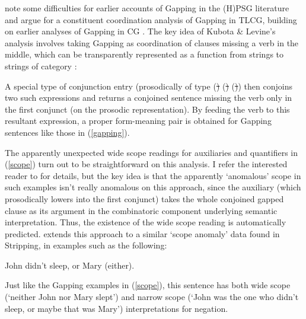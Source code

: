 \documentclass[output=paper]{langsci/langscibook}
\begin{document}
\citet{kubota-levine-nels,kubota-levine-gapping} note some
difficulties for earlier accounts of Gapping in the (H)PSG literature
\citep{sgww,abeille-ea} and argue for a constituent coordination
analysis of Gapping in TLCG, building on earlier analyses of Gapping
in CG \citep{Steedman90a-u,hendriks95,morrillsolias93}. The key idea
of Kubota \& Levine's analysis involves taking Gapping as coordination of clauses
missing a verb in the middle, which can be transparently represented
as a function from strings to strings of category {}:

\begin{exe}
 \ex
  \LexEnt{\pt{\ensuremath{\lambda} \ensuremath{\greekp}. leslie \ensuremath{\circ}\xspace \ensuremath{\greekp} \ensuremath{\circ}\xspace a \ensuremath{\circ}\xspace cd }}{\sem{ \lambda R. \exists x. \trns{cd}(x) \ensuremath{ \wedge\xspace } R(x)(\trns{l}) }}{\syncat{S\vs ((NP\ensuremath{\backslash}{}S)/NP)}}
\end{exe}
A special type of conjunction entry (prosodically of type
(\st\xspace \shortarrow \st\xspace) \shortarrow (\st\xspace
\shortarrow \st\xspace) \shortarrow (\st\xspace \shortarrow \st\xspace))
then conjoins two such expressions
and returns a conjoined sentence missing the verb only in the first
conjunct (on the prosodic representation). By feeding the verb to
this resultant expression,  a proper form-meaning  pair is obtained
for Gapping sentences like those in (\ref{gapping}).

The apparently unexpected wide scope readings for auxiliaries and
quantifiers in (\ref{scope}) turn out to be straightforward on this
analysis. I refer the interested reader to \citet{kubota-levine-gapping} for
details, but the key idea is that the apparently `anomalous' scope in
such examples isn't really anomalous on this approach, since the
auxiliary (which prosodically lowers into the first conjunct) takes
the whole conjoined gapped clause as its argument in the combinatoric
component underlying semantic interpretation. Thus, the existence
of the wide scope reading is automatically predicted.
\citet{puthawala2018} extends this approach to a similar `scope anomaly'
data found in Stripping, in examples such as the following:

\begin{exe}
 \ex   John didn't sleep, or Mary (either).
\end{exe}
Just like the Gapping examples in (\ref{scope}), this sentence has
both wide scope (`neither John nor Mary slept') and narrow scope
(`John was the one who didn't sleep, or maybe that was Mary')
interpretations for negation.
\end{document}
